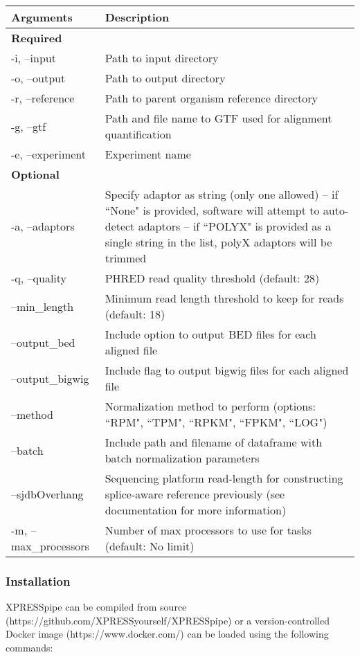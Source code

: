 \documentclass[11pt, a4paper, oneside]{article}
\begin{document}
\begin{tabular}{p{5cm}p{13cm}}
 \textbf{Arguments} & \textbf{Description} \\
 \hline
 \textbf{Required} & \\
 \hline
 -i, --input & Path to input directory \\
 \hline
 -o, --output & Path to output directory \\
 \hline
 -r, --reference & Path to parent organism reference directory \\
 \hline
 -g, --gtf & Path and file name to GTF used for alignment quantification \\
 \hline
 -e, --experiment & Experiment name \\
 \hline
 \textbf{Optional} & \\
 \hline
 -a, --adaptors & Specify adaptor as string (only one allowed) -- if ``None" is provided, software will attempt to auto-detect adaptors -- if ``POLYX" is provided as a single string in the list, polyX adaptors will be trimmed \\
 \hline
 -q, --quality & PHRED read quality threshold (default: 28) \\
 \hline
 --min\_length & Minimum read length threshold to keep for reads (default: 18) \\
 \hline
 --output\_bed & Include option to output BED files for each aligned file \\
 \hline
 --output\_bigwig & Include flag to output bigwig files for each aligned file \\
 \hline
 --method & Normalization method to perform (options: ``RPM", ``TPM", ``RPKM", ``FPKM", ``LOG") \\
 \hline
 --batch & Include path and filename of dataframe with batch normalization parameters \\
 \hline
 --sjdbOverhang & Sequencing platform read-length for constructing splice-aware reference previously (see documentation for more information) \\
 \hline
 -m, --max\_processors & Number of max processors to use for tasks (default: No limit) \\
\end{tabular}
\newline

\subsubsection{Installation}
XPRESSpipe can be compiled from source (https://github.com/XPRESSyourself/XPRESSpipe) or a version-controlled Docker image (https://www.docker.com/) can be loaded using the following commands:
\newline
\end{document}
